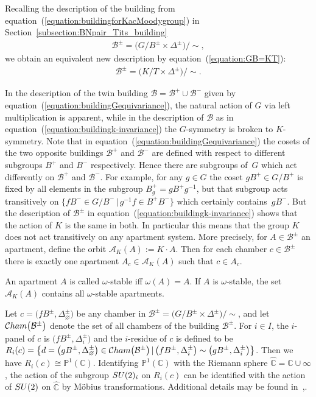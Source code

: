 \documentclass[11pt]{article}
\numberwithin{equation}{section}
\numberwithin{equation}{section}
\def\C{{\mathbb C}}
\def\P{{\mathbb P}}
\def\cA{\mathcal A}
\def\cB{\mathcal B}
\def\cCham{{\mathcal C}{\rm ham}}
\begin{document}
Recalling the description of the building from equation~(\ref{equation:buildingforKacMoodygroup}) in Section~\ref{subsection:BNpair_Tits_building}
\begin{gather}\label{equation:buildingGequivariance}
\cB^{\pm}=\big(G/B^{\pm}\times \Delta^{\pm}\big)/{\sim},
\end{gather}
we obtain an equivalent new description by equation~(\ref{equation:GB=KT}):
\begin{gather}\label{equation:buildingk-invariance}
\cB^{\pm}=\big(K/T\times \Delta^{\pm}\big)/{\sim}.
\end{gather}

In the description of the twin building $\cB=\cB^+\cup \cB^-$ given by equation~(\ref{equation:buildingGequivariance}), the natural action of $G$ via left multiplication is apparent, while in the description of $\cB$ as in equation~(\ref{equation:buildingk-invariance}) the $G$-symmetry is broken to $K$-symmetry. Note that in equation~(\ref{equation:buildingGequivariance}) the cosets of the two opposite buildings $\cB^+$ and $\cB^-$ are defined with respect to different subgroups $B^+$ and $B^-$ respectively. Hence there are subgroups of~$G$ which act differently on $\cB^+$ and $\cB^-$. For example, for any $g\in G$ the coset $gB^+\in G/B^+$ is fixed by all elements in the subgroup
$B^+_g=gB^+g^{-1}$, but that subgroup acts transitively on $\big\{fB^-\in G/B^-\, |\, g^{-1}f\in B^+B^-\big\}$ which certainly contains~$gB^-$. But the description of $\cB^\pm$ in equation~(\ref{equation:buildingk-invariance}) shows that the action of $K$ is the same in both. In particular this means that the group $K$ does not act transitively on any apartment system. More precisely, for $A\in\cB^\pm$ an apartment, define the orbit $\cA_K(A) := K\cdot A$. Then for each chamber $c\in\cB^\pm$ there is exactly one apartment $A_c\in \cA_K(A)$ such that $c\in A_c$.

An apartment $A$ is called $\omega$-stable iff $\omega(A)=A$. If $A$ is $\omega$-stable, the set $\cA_K(A)$ contains all $\omega$-stable apartments.

Let $c = \big(fB^\pm, \Delta_\varnothing^\pm\big)$ be any chamber in $\cB^\pm=\big(G/B^\pm\times \Delta^\pm\big)/{\sim}$, and let $\cCham\big(\cB^\pm\big)$ denote the set of all chambers of the building $\cB^\pm$.
For $i\in I$, the $i$-panel of $c$ is $\big(fB^\pm, \Delta_i^\pm\big)$ and the $i$-residue of $c$ is defined to be
$R_i(c)=\big\{d = \big(gB^\pm, \Delta_\varnothing^\pm\big)\in\cCham\big(\cB^\pm\big)\, |\, \big(fB^\pm, \Delta_i^\pm\big) \sim \big(gB^\pm, \Delta_i^\pm\big) \big\}$. Then we have $R_i(c)\cong \P^1(\C)$. Identifying $\mathbb{P}^1(\C)$ with the Riemann sphere $\widehat{\C}=\C\cup \infty$, the action of the subgroup ${\rm SU}(2)_i$ on $R_i(c)$ can be identified with the action of ${\rm SU}(2)$ on $\widehat{\C}$ by M\"obius transformations. Additional details may be found in~\cite[Chapter~6]{AbramenkoBrown08},.
\end{document}
